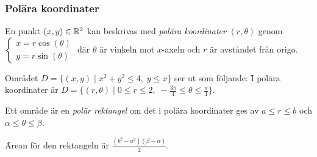 \documentclass[a4paper]{article}
\begin{document}
\subsubsection{Polära koordinater}
En punkt \(
    (x,y) \in \mathbb{R}^2
\) kan beskrivas med \emph{polära koordinater} \(
    (r, \theta)
\) genom \(
    \left\{\begin{matrix}
        x = r \cos(\theta) \\ 
        y = r \sin(\theta)
    \end{matrix}\right.
\) där \(
    \theta
\) är vinkeln mot \(
    x
\)-axeln och \(
    r
\) är avståndet från origo.

\begin{ex}
    Området \(
        D  =\{(x,y) \; | \; x^2+y^2 \leq 4,\; y \leq x\}
    \) ser ut som följande:
    \f

    I polära koordinater är \(
        D = \{ (r, \theta) \; | \; 0 \leq r \leq 2, \; -\frac{3\pi}{4}  \leq \theta \leq \frac{\pi}{4}  \}
    \).
\end{ex}

\begin{defn}
    Ett område är en \emph{polär rektangel} om det i polära koordinater ges av 
    \(
        a \leq r \leq b
    \) och \(
        \alpha \leq \theta \leq \beta
    \). 

    \f

    Arean för den rektangeln är \(
        \frac{(b^2-a^2)(\beta - \alpha)}{2} 
    \).
\end{defn}
\end{document}
